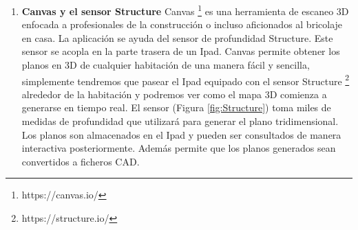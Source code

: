 \begin {enumerate}
\begin{figure}[htbp]
\begin{center}
\end{center}
\caption{Recreación del Coliseo de Roma generado con Photo Tourism. }
\end{figure}



\item \textbf{Canvas y el sensor Structure}
Canvas \footnote{https://canvas.io/ } es una herramienta de escaneo 3D enfocada a profesionales de la construcción o incluso aficionados al bricolaje en casa. La aplicación se ayuda del sensor de profundidad Structure. Este sensor se acopla en la parte trasera de un Ipad. Canvas permite obtener los planos en 3D de cualquier habitación de una manera fácil y sencilla, simplemente tendremos que pasear el Ipad equipado con el sensor Structure \footnote{https://structure.io/} alrededor de la habitación y podremos ver como el mapa 3D comienza a generarse en tiempo real. El sensor (Figura \ref{fig:Structure}) toma miles de medidas de profundidad que utilizará para generar el plano tridimensional. Los planos son almacenados en el Ipad y pueden ser consultados de manera interactiva posteriormente. Además permite que los planos generados sean convertidos a ficheros CAD.

\end {enumerate}

